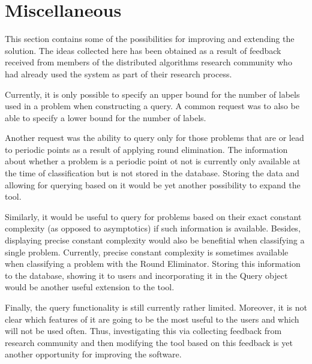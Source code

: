 \section{Miscellaneous}

This section contains some of the possibilities
for improving and extending the solution. The ideas collected
here has been obtained as a result of feedback
received from members of the distributed algorithms
research community who had already used the system
as part of their research process.

Currently, it is only possible to specify an upper bound for
the number of labels used in a problem when constructing a query.
A common request was to also be able to specify a lower bound for the
number of labels.

Another request was the ability to query only for those problems that are
or lead to periodic points as a result of applying round elimination.
The information about whether a problem is a periodic point ot not
is currently only available at the time of classification but is
not stored in the database. Storing the data and allowing for
querying based on it would be yet another possibility to expand the tool.

Similarly, it would be useful to query for problems based on their
exact constant complexity (as opposed to asymptotics) if such
information is available. Besides, displaying precise constant complexity
would also be benefitial when classifying a single problem.
Currently, precise constant complexity is sometimes available when
classifying a problem with the Round Eliminator. Storing this
information to the database, showing it to users and incorporating it
in the Query object would be another useful extension to the tool.

Finally, the query functionality is still currently rather limited.
Moreover, it is not clear which features of it are going to be the
most useful to the users and which will not be used often.
Thus, investigating this via collecting feedback from
research community and then modifying the tool based on
this feedback is yet another opportunity for improving the software.

